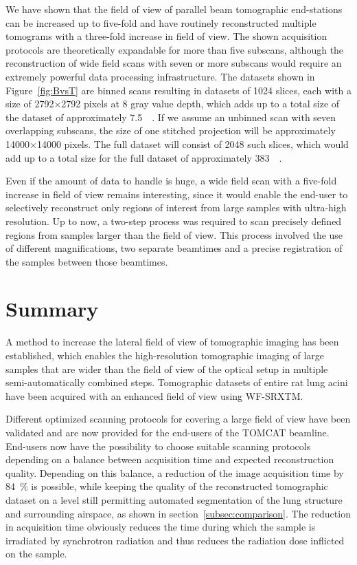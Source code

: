 We have shown that the field of view of parallel beam tomographic end-stations can be increased up to five-fold and have routinely reconstructed multiple tomograms with a three-fold increase in field of view. The shown acquisition protocols are theoretically expandable for more than five subscans, although the reconstruction of wide field scans with seven or more subscans would require an extremely powerful data processing infrastructure. The datasets shown in Figure~\ref{fig:BvsT} are binned scans resulting in datasets of 1024 slices, each with a size of 2792$\times$2792 pixels at \SI{8}{\bit} gray value depth, which adds up to a total size of the dataset of approximately \SI{7.5}{\giga\byte}. If we assume an unbinned scan with seven overlapping subscans, the size of one stitched projection will be approximately 14000$\times$14000 pixels. The full dataset will consist of 2048 such slices, which would add up to a total size for the full dataset of approximately \SI{383}{\giga\byte}.

Even if the amount of data to handle is huge, a wide field scan with a five-fold increase in field of view remains interesting, since it would enable the end-user to selectively reconstruct only regions of interest from large samples with ultra-high resolution. Up to now, a two-step process was required to scan precisely defined regions from samples larger than the field of view. This process involved the use of different magnifications, two separate beamtimes and a precise registration of the samples between those beamtimes.

\section{Summary}\label{summary}
A method to increase the lateral field of view of tomographic imaging has been established, which enables the high-resolution tomographic imaging of large samples that are wider than the field of view of the optical setup in multiple semi-automatically combined steps. Tomographic datasets of entire rat lung acini have been acquired with an enhanced field of view using \ac{WF-SRXTM}.

Different optimized scanning protocols for covering a large field of view have been validated and are now provided for the end-users of the \ac{TOMCAT} beamline. End-users now have the possibility to choose suitable scanning protocols depending on a balance between acquisition time and expected reconstruction quality. Depending on this balance, a reduction of the image acquisition time by \SI{84}{\percent} is possible, while keeping the quality of the reconstructed tomographic dataset on a level still permitting automated segmentation of the lung structure and surrounding airspace, as shown in section~\ref{subsec:comparison}. The reduction in acquisition time obviously reduces the time during which the sample is irradiated by synchrotron radiation and thus reduces the radiation dose inflicted on the sample.

